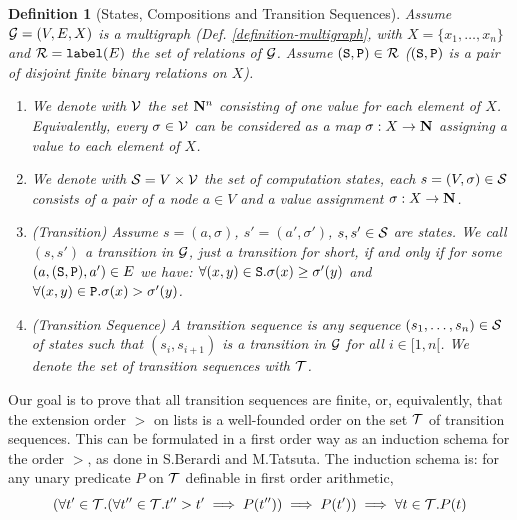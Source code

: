 \documentclass{lmcs}
\newtheorem{definition}[theorem]{Definition}
\begin{document}
\begin{definition}[States, Compositions and Transition Sequences]
Assume ${\mathcal G}=(V,E,X)$ is a multigraph (Def. \ref{definition-multigraph},
with $X= \{x_1, \ldots, x_n\}$ and ${\mathcal R} = {\tt label}(E)$ the set of relations of ${\mathcal G}$.  
Assume $({\tt S},{\tt P}) \in {\mathcal R}$ 
($({\tt S},{\tt P})$ is a pair of \emph{disjoint} finite binary relations on $X$). 
\begin{enumerate}

\item
We denote with ${{\mathcal V}}$ the set ${\bf N}^n$ consisting of one value for each element of $X$.
Equivalently, every $\sigma \in {{\mathcal V}}$ can be considered as a map 
$\sigma: X \rightarrow {\bf N}$ assigning a value to each element of $X$. 

\item
We denote with ${\mathcal S} = V \times {{\mathcal V}}$ the set of \emph{computation states},
each $s=(V,\sigma) \in {\mathcal S}$ consists of a pair of a node $a \in V$
and a value assignment $\sigma: X \rightarrow {\bf N}$.

\item
\emph{(Transition)}
Assume $s=(a, \sigma)$, $s'=(a', \sigma')$, $s, s' \in {\mathcal S}$
are states. 
We call $(s,s')$ a \emph{transition in ${\mathcal G}$}, just
a \emph{transition} for short,  if and only if
for \emph{some} $(a,({\tt S},{\tt P}),a') \in E$ we have:
$\forall (x,y) \in {\tt S}. \sigma(x) \ge \sigma'(y)$
and $\forall (x,y) \in {\tt P}. \sigma(x) > \sigma'(y)$.


\item
\emph{(Transition Sequence)}
A \emph{transition sequence} 
is any sequence $(s_1, \ldots, s_n) \in {\mathcal S}$ of states
such that $(s_i, s_{i+1})$ is a transition in ${\mathcal G}$ for all $i \in [1,n[$. 
We denote the set of transition sequences with ${\mathcal T}$.
\end{enumerate}
\end{definition}

Our goal is to prove that all transition sequences are finite, or, equivalently, that
the extension order $>$ on lists is a well-founded order on the set ${\mathcal T}$ of
transition sequences. This can be formulated in a first order way
as an induction schema for the order $>$, as done in S.Berardi and M.Tatsuta.
The induction schema is: for any unary predicate $P$ on ${\mathcal T}$ definable in first order
arithmetic,
$$
(\forall t' \in {\mathcal T}. (\forall t'' \in {\mathcal T}. t'' > t' \implies P(t'')) \implies P(t')) 
\implies 
\forall t \in {\mathcal T}.P(t)
$$
\end{document}
